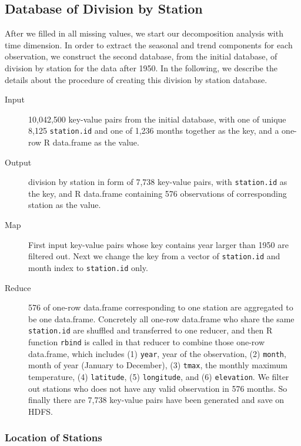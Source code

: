 \subsection{Database of Division by Station}
\label{sec:a1950.divibyStation}

After we filled in all missing values, we start our decomposition analysis with 
time dimension. In order to extract the seasonal and trend components for each 
observation, we construct the second database, from the initial database, of 
division by station for the data after 1950. In the following, we describe the 
details about the procedure of creating this division by station database.

\begin{description}
  \item[Input] 10,042,500 key-value pairs from the initial database, with one of
  unique 8,125 \texttt{station.id} and one of 1,236 months together as the key, 
  and a one-row R data.frame as the value. 
  \item[Output] division by station in form of 7,738 key-value pairs, with 
  \texttt{station.id} as the key, and R data.frame containing 576 observations 
  of corresponding station as the value.
  \item[Map]First input key-value pairs whose key contains year larger than 1950
  are filtered out. Next we change the key from a vector of \texttt{station.id} 
  and month index to \texttt{station.id} only. 
  \item[Reduce] 576 of one-row data.frame corresponding to one station are 
  aggregated to be one data.frame. Concretely all one-row data.frame who share
  the same \texttt{station.id} are shuffled and transferred to one reducer, and 
  then R function \texttt{rbind} is called in that reducer to combine those one-row 
  data.frame, which includes (1) \texttt{year}, year of the observation, 
  (2) \texttt{month}, month of year (January to December), (3) \texttt{tmax}, 
  the monthly maximum temperature, (4) \texttt{latitude}, (5) \texttt{longitude}, 
  and (6) \texttt{elevation}. We filter out stations who does not have any valid
  observation in 576 months. So finally there are 7,738 key-value pairs have been
  generated and save on HDFS. 
\end{description}

\subsubsection{Location of Stations}

